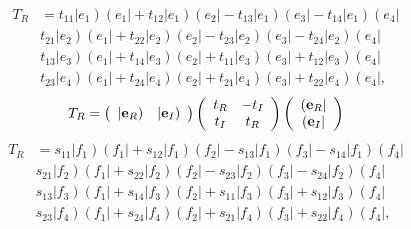 \documentclass[aps,preprint]{revtex4}%
\begin{document}
%

\begin{align}
T_{R}  &  =t_{11}\left\vert e_{1}\right)  \left(  e_{1}\right\vert
+t_{12}\left\vert e_{1}\right)  \left(  e_{2}\right\vert -t_{13}\left\vert
e_{1}\right)  \left(  e_{3}\right\vert -t_{14}\left\vert e_{1}\right)  \left(
e_{4}\right\vert \\
&  t_{21}\left\vert e_{2}\right)  \left(  e_{1}\right\vert +t_{22}\left\vert
e_{2}\right)  \left(  e_{2}\right\vert -t_{23}\left\vert e_{2}\right)  \left(
e_{3}\right\vert -t_{24}\left\vert e_{2}\right)  \left(  e_{4}\right\vert \\
&  t_{13}\left\vert e_{3}\right)  \left(  e_{1}\right\vert +t_{14}\left\vert
e_{3}\right)  \left(  e_{2}\right\vert +t_{11}\left\vert e_{3}\right)  \left(
e_{3}\right\vert +t_{12}\left\vert e_{3}\right)  \left(  e_{4}\right\vert \\
&  t_{23}\left\vert e_{4}\right)  \left(  e_{1}\right\vert +t_{24}\left\vert
e_{4}\right)  \left(  e_{2}\right\vert +t_{21}\left\vert e_{4}\right)  \left(
e_{3}\right\vert +t_{22}\left\vert e_{4}\right)  \left(  e_{4}\right\vert ,
\end{align}%
\begin{equation}
T_{R}=\left(
\begin{array}
[c]{cc}%
\left\vert \mathbf{e}_{R}\right)  & \left\vert \mathbf{e}_{I}\right)
\end{array}
\right)  \left(
\begin{array}
[c]{cc}%
t_{R} & -t_{I}\\
t_{I} & t_{R}%
\end{array}
\right)  \left(
\begin{array}
[c]{c}%
\left(  \mathbf{e}_{R}\right\vert \\
\left(  \mathbf{e}_{I}\right\vert
\end{array}
\right)
\end{equation}%
\begin{align}
T_{R}  &  =s_{11}\left\vert f_{1}\right)  \left(  f_{1}\right\vert
+s_{12}\left\vert f_{1}\right)  \left(  f_{2}\right\vert -s_{13}\left\vert
f_{1}\right)  \left(  f_{3}\right\vert -s_{14}\left\vert f_{1}\right)  \left(
f_{4}\right\vert \\
&  s_{21}\left\vert f_{2}\right)  \left(  f_{1}\right\vert +s_{22}\left\vert
f_{2}\right)  \left(  f_{2}\right\vert -s_{23}\left\vert f_{2}\right)  \left(
f_{3}\right\vert -s_{24}\left\vert f_{2}\right)  \left(  f_{4}\right\vert \\
&  s_{13}\left\vert f_{3}\right)  \left(  f_{1}\right\vert +s_{14}\left\vert
f_{3}\right)  \left(  f_{2}\right\vert +s_{11}\left\vert f_{3}\right)  \left(
f_{3}\right\vert +s_{12}\left\vert f_{3}\right)  \left(  f_{4}\right\vert \\
&  s_{23}\left\vert f_{4}\right)  \left(  f_{1}\right\vert +s_{24}\left\vert
f_{4}\right)  \left(  f_{2}\right\vert +s_{21}\left\vert f_{4}\right)  \left(
f_{3}\right\vert +s_{22}\left\vert f_{4}\right)  \left(  f_{4}\right\vert ,
\end{align}%
\end{document}
